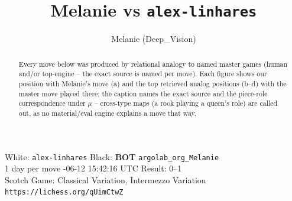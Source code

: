 \documentclass[11pt]{article}
\title{Melanie vs \texttt{alex-linhares}}
\author{Melanie (Deep\_Vision)}
\date{}
\begin{document}
\maketitle
\begin{center}\small
White: \texttt{alex-linhares} \quad Black: \textbf{BOT} \texttt{argolab\_org\_Melanie} \\
1 day per move -06-12 15:42:16 UTC \quad Result: 0--1 \\
Scotch Game: Classical Variation, Intermezzo Variation \\
\texttt{https://lichess.org/qUimCtwZ}
\end{center}
\begin{abstract}Every move below was produced by relational analogy to named master games (human and/or top-engine -- the exact source is named per move). Each figure shows our position with Melanie's move (a) and the top retrieved analog positions (b--d) with the master move played there; the caption names the exact source and the piece-role correspondence under $\mu$ -- cross-type maps (a rook playing a queen's role) are called out, as no material/eval engine explains a move that way.\end{abstract}
\end{document}

